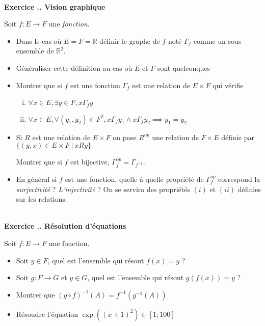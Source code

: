 \documentclass{article}
\newcommand{\mb}[1]{\mathbb{#1}}
\newcounter{exo}
\newcommand{\exercice}[1][\null]{\textbf{\\ \large Exercice \thesection.\theexo. \normalsize #1} \addtocounter{exo}{1}}
\begin{document}
\exercice[Vision graphique]

Soit $f : E \to F$ une \emph{fonction}.

\begin{itemize}
    \item Dans le cas où $E = F = \mb{R}$ 
        définir le graphe de $f$ noté $\Gamma_f$ 
        comme un sous ensemble de $\mb{R}^2$.

    \item Généraliser cette définition 
        au cas où $E$ et $F$ sont quelconques 

    \item Montrer que si $f$ est une fonction 
        $\Gamma_f$ est une relation de $E \times F$ 
        qui vérifie
        \begin{enumerate}[(i)]
            \item $\forall x \in E, \exists y \in F, x \Gamma_f y$
            \item $\forall x \in E, \forall (y_1,y_2) \in F^2, 
                x \Gamma_f y_1 \wedge x \Gamma_f y_2 \implies 
                y_1 = y_2$
        \end{enumerate}

    \item Si $R$ est une relation de $E \times F$
        on pose $R^{op}$ une relation de $F \times E$
        définie par $\{ (y,x) \in E\times F ~|~ x R y \}$

        Montrer que si $f$ est bijective, $\Gamma_f^{op} = \Gamma_{f^{-1}}$.

    \item En général si $f$ est une fonction, quelle 
        à quelle propriété de $\Gamma_f^{op}$ correspond la 
        \emph{surjectivité} ? \emph{L'injectivité} ? On 
        se servira des propriétés $(i)$ et $(ii)$ définies 
        sur les relations.
\end{itemize}


\exercice[Résolution d'équations]

Soit $f : E \to F$ une fonction.

\begin{itemize}
    \item Soit $y \in F$, quel est l'ensemble 
        qui résout $f(x) = y$ ?

    \item Soit $g : F \to G$ et $y \in G$, quel
        est l'ensemble qui résout $g(f(x)) = y$ ?

    \item Montrer que $(g \circ f)^{-1}(A) = f^{-1} (g^{-1} (A))$

    \item Résoudre l'équation $\exp ((x + 1)^2) \in [1; 100]$

\end{itemize}
\end{document}
